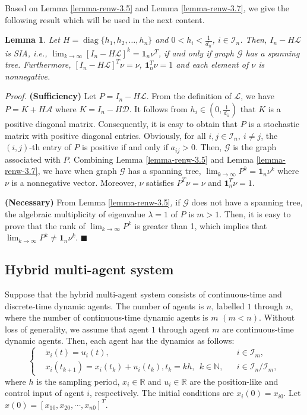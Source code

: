 \documentclass[12pt,draftcls,onecolumn]{IEEEtran}
\newtheorem{lemma}{Lemma}
\DeclareMathOperator{\diag}{diag}
\begin{document}
Based on Lemma \ref{lemma-renw-3.5} and Lemma \ref{lemma-renw-3.7}, we give the following result which will be used in the next content.

\begin{lemma}\label{lemma-1}
Let $H=\diag\{h_1,h_2,\dots,h_n\}$ and $0<h_i<\frac{1}{d_{ii}}$, $i\in \mathcal{I}_n$. Then, $I_n-H\mathscr{L}$ is SIA, i.e., $\lim_{k\rightarrow \infty}\left[I_n-H\mathscr{L}\right]^k=\mathbf{1}_n\nu^T$, if and only if graph $\mathscr{G}$ has a spanning tree. Furthermore, $\left[I_n-H\mathscr{L}\right]^T\nu  = \nu$, $\mathbf{1}_n^T \nu = 1$ and each element of $\nu$ is nonnegative.
\end{lemma}
{\it Proof.} \textbf{(Sufficiency)} Let $P=I_n-H\mathscr{L}$. From the definition of $\mathscr{L}$, we have $P=K+H\mathscr{A}$ where $K=I_n-H\mathscr{D}$. It follows from $h_i\in \left(0,\frac{1}{d_{ii}}\right)$ that $K$ is a positive diagonal matrix. Consequently, it is easy to obtain that $P$ is a stochastic matrix with positive diagonal entries. Obviously, for all $i,j\in \mathcal{I}_n,~i\neq j$, the $(i,j)$-th entry of $P$ is positive if and only if $a_{ij}>0$. Then, $\mathscr{G}$ is the graph associated with $P$. Combining Lemma \ref{lemma-renw-3.5} and Lemma \ref{lemma-renw-3.7}, we have when graph $\mathscr{G}$ has a spanning tree, $\lim_{k\rightarrow \infty}P^k=\mathbf{1}_n\nu^k$ where $\nu$ is a nonnegative vector. Moreover, $\nu$ satisfies $P^T\nu  = \nu$ and $\mathbf{1}_n^T \nu =1$.

\textbf{(Necessary)} From Lemma \ref{lemma-renw-3.5}, if $\mathscr{G}$ does not have a spanning tree, the algebraic multiplicity of eigenvalue $\lambda= 1$ of $P$ is $m>1$. Then, it is easy to prove that the rank of $\lim_{k\rightarrow \infty}P^k$ is greater than 1, which implies that $\lim_{k\rightarrow \infty}P^k\neq \mathbf{1}_n\nu^k$. $\blacksquare$


\subsection{Hybrid multi-agent system}\label{s-Hybrid multi-agent systems}

Suppose that the hybrid multi-agent system consists of continuous-time and discrete-time dynamic agents. The number of agents is $n$, labelled $1$ through $n$, where the number of continuous-time dynamic agents is $m$ $(m<n)$. Without loss of generality, we assume that agent $1$ through agent $m$ are continuous-time dynamic agents. Then, each agent has the dynamics as follows:
\begin{equation}\label{mod-hybrid}
\left\{
   \begin{aligned}
   &\dot{x}_{i}(t)=u_{i}(t), &&i \in \mathcal{I}_{m}, \\
   &x_{i}(t_{k+1})=x_{i}(t_{k})+u_{i}(t_{k}), t_k=kh,~~k\in \mathbb{N}, &&i\in\mathcal{I}_{n}/\mathcal{I}_{m},
   \end{aligned}
   \right.
  \end{equation}
where $h$ is the sampling period, $x_{i}\in \mathbb{R}$ and $u_{i}\in \mathbb{R}$ are the position-like and control input of agent $i$, respectively. The initial conditions are $x_{i}(0)=x_{i0}$.  Let $x(0)=[x_{10}, x_{20}, \cdots, x_{n0}]^{T}$.
\end{document}
